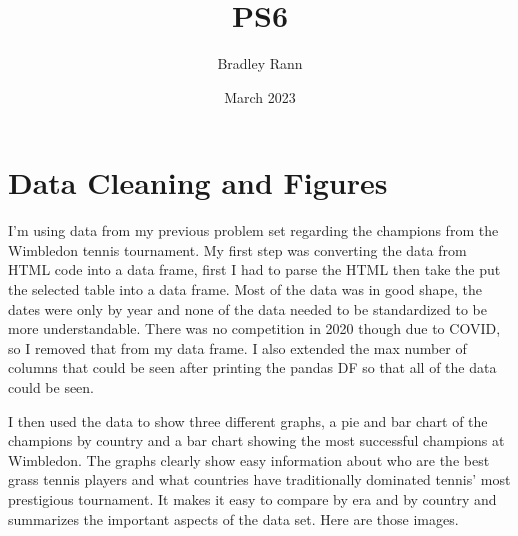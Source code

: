 \documentclass{article}
\title{PS6}
\author{Bradley Rann }
\date{March 2023}
\begin{document}
\maketitle

\section{Data Cleaning and Figures}
I'm using data from my previous problem set regarding the champions from the Wimbledon tennis tournament. My first step was converting the data from HTML code into a data frame, first I had to parse the HTML then take the put the selected table into a data frame. Most of the data was in good shape, the dates were only by year and none of the data needed to be standardized to be more understandable. There was no competition in 2020 though due to COVID, so I removed that from my data frame. I also extended the max number of columns that could be seen after printing the pandas DF so that all of the data could be seen.

I then used the data to show three different graphs, a pie and bar chart of the champions by country and a bar chart showing the most successful champions at Wimbledon. The graphs clearly show easy information about who are the best grass tennis players and what countries have traditionally dominated tennis' most prestigious tournament. It makes it easy to compare by era and by country and summarizes the important aspects of the data set. Here are those images.
\end{document}
